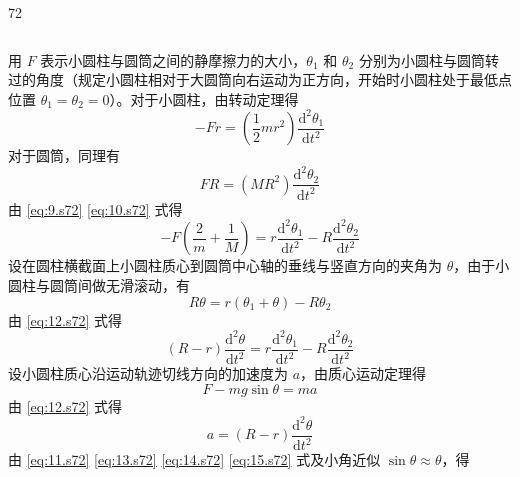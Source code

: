 \begin{solution}{72}
\begin{subsolution}
\begin{equation}
            \label{eq:8.s72}
        \end{equation}
    \end{subsolution}
    \begin{subsolution}
        用 $F$ 表示小圆柱与圆筒之间的静摩擦力的大小，$\theta_{1}$ 和 $\theta_{2}$ 分别为小圆柱与圆筒转过的角度（规定小圆柱相对于大圆筒向右运动为正方向，开始时小圆柱处于最低点位置 $\theta_{1} = \theta_{2} = 0$）。对于小圆柱，由转动定理得
        \begin{equation}
            - F r = \left(\frac{1}{2} m r^{2}\right) \frac{\mathrm{d}^{2} \theta_{1}}{\mathrm{d} t^{2}}
            \label{eq:9.s72}
        \end{equation}
        对于圆筒，同理有
        \begin{equation}
            F R = (M R^{2}) \frac{\mathrm{d}^{2} \theta_{2}}{\mathrm{d} t^{2}}
            \label{eq:10.s72}
        \end{equation}
        由 \eqref{eq:9.s72} \eqref{eq:10.s72} 式得
        \begin{equation}
            - F \left(\frac{2}{m} + \frac{1}{M}\right) = r \frac{\mathrm{d}^{2} \theta_{1}}{\mathrm{d} t^{2}} - R \frac{\mathrm{d}^{2} \theta_{2}}{\mathrm{d} t^{2}}
            \label{eq:11.s72}
        \end{equation}
        设在圆柱横截面上小圆柱质心到圆筒中心轴的垂线与竖直方向的夹角为 $\theta$，由于小圆柱与圆筒间做无滑滚动，有
        \begin{equation}
            R \theta = r (\theta_{1} + \theta) - R \theta_{2}
            \label{eq:12.s72}
        \end{equation}
        由 \eqref{eq:12.s72} 式得
        \begin{equation}
            (R - r) \frac{\mathrm{d}^{2} \theta}{\mathrm{d} t^{2}} = r \frac{\mathrm{d}^{2} \theta_{1}}{\mathrm{d} t^{2}} - R \frac{\mathrm{d}^{2} \theta_{2}}{\mathrm{d} t^{2}}
            \label{eq:13.s72}
        \end{equation}
        设小圆柱质心沿运动轨迹切线方向的加速度为 $a$，由质心运动定理得
        \begin{equation}
            F - m g \sin \theta = m a
            \label{eq:14.s72}
        \end{equation}
        由 \eqref{eq:12.s72} 式得
        \begin{equation}
            a = (R - r) \frac{\mathrm{d}^{2} \theta}{\mathrm{d} t^{2}}
            \label{eq:15.s72}
        \end{equation}
        由 \eqref{eq:11.s72} \eqref{eq:13.s72} \eqref{eq:14.s72} \eqref{eq:15.s72} 式及小角近似 $\sin \theta \approx \theta$，得

\end{subsolution}
\end{solution}
